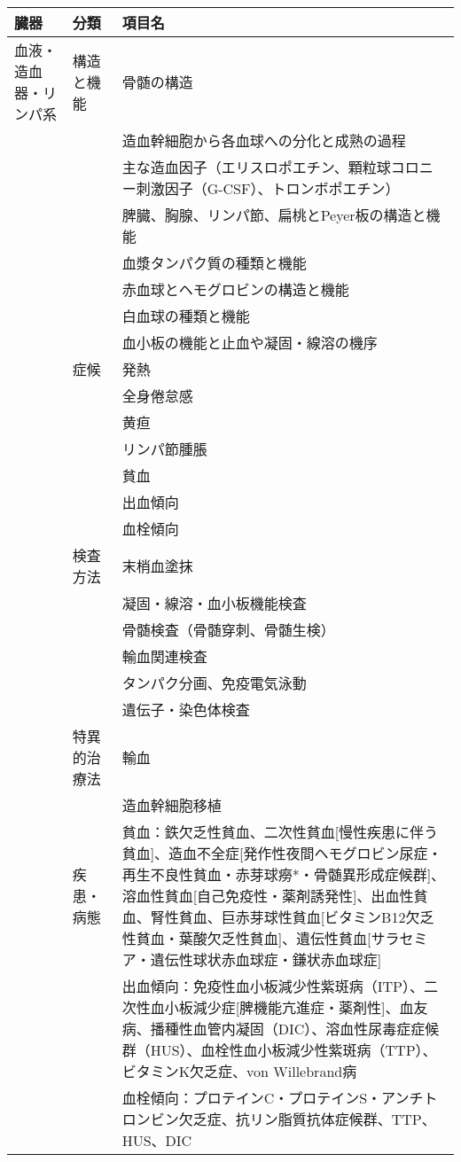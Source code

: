 \begin{xltabular}{\linewidth}{XXX}
\caption{\label{tbl:知識}} \\
\toprule
臓器 & 分類 & 項目名 \\
\midrule
\endhead
血液・造血器・リンパ系 & 構造と機能 & 骨髄の構造 \\
 &  & 造血幹細胞から各血球への分化と成熟の過程 \\
 &  & 主な造血因子（エリスロポエチン、顆粒球コロニー刺激因子（G-CSF）、トロンボポエチン） \\
 &  & 脾臓、胸腺、リンパ節、扁桃とPeyer板の構造と機能 \\
 &  & 血漿タンパク質の種類と機能 \\
 &  & 赤血球とヘモグロビンの構造と機能 \\
 &  & 白血球の種類と機能 \\
 &  & 血小板の機能と止血や凝固・線溶の機序 \\
 & 症候 & 発熱 \\
 &  & 全身倦怠感 \\
 &  & 黄疸 \\
 &  & リンパ節腫脹 \\
 &  & 貧血 \\
 &  & 出血傾向 \\
 &  & 血栓傾向 \\
 & 検査方法 & 末梢血塗抹 \\
 &  & 凝固・線溶・血小板機能検査 \\
 &  & 骨髄検査（骨髄穿刺、骨髄生検） \\
 &  & 輸血関連検査 \\
 &  & タンパク分画、免疫電気泳動 \\
 &  & 遺伝子・染色体検査 \\
 & 特異的治療法 & 輸血 \\
 &  & 造血幹細胞移植 \\
 & 疾患・病態 & 貧血：鉄欠乏性貧血、二次性貧血[慢性疾患に伴う貧血]、造血不全症[発作性夜間ヘモグロビン尿症・再生不良性貧血・赤芽球癆*・骨髄異形成症候群]、溶血性貧血[自己免疫性・薬剤誘発性]、出血性貧血、腎性貧血、巨赤芽球性貧血[ビタミンB12欠乏性貧血・葉酸欠乏性貧血]、遺伝性貧血[サラセミア・遺伝性球状赤血球症・鎌状赤血球症] \\
 &  & 出血傾向：免疫性血小板減少性紫斑病（ITP）、二次性血小板減少症[脾機能亢進症・薬剤性]、血友病、播種性血管内凝固（DIC）、溶血性尿毒症症候群（HUS）、血栓性血小板減少性紫斑病（TTP）、ビタミンK欠乏症、von Willebrand病 \\
 &  & 血栓傾向：プロテインC・プロテインS・アンチトロンビン欠乏症、抗リン脂質抗体症候群、TTP、HUS、DIC \\

\end{xltabular}
